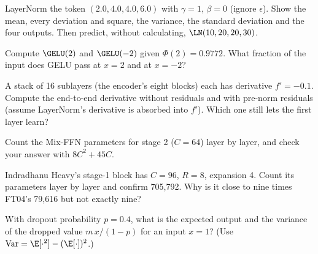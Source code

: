 \begin{checkyourself}
\item\label{ex:block:1} LayerNorm the token $(2.0, 4.0, 4.0, 6.0)$ with $\gamma = 1$, $\beta = 0$
(ignore $\epsilon$). Show the mean, every deviation and square, the variance, the standard deviation
and the four outputs. Then predict, without calculating, $\LN(10, 20, 20, 30)$.
\item\label{ex:block:2} Compute $\GELU(2)$ and $\GELU(-2)$ given $\Phi(2) = 0.9772$. What fraction
of the input does GELU pass at $x = 2$ and at $x = -2$?
\item\label{ex:block:3} A stack of 16 sublayers (the encoder's eight blocks) each has derivative
$f' = -0.1$. Compute the end-to-end derivative without residuals and with pre-norm residuals
(assume LayerNorm's derivative is absorbed into $f'$). Which one still lets the first layer learn?
\item\label{ex:block:4} Count the Mix-FFN parameters for stage 2 ($C = 64$) layer by layer, and
check your answer with $8C^2 + 45C$.
\item\label{ex:block:5} Indradhanu Heavy's stage-1 block has $C = 96$, $R = 8$, expansion 4. Count
its parameters layer by layer and confirm 705{,}792. Why is it close to nine times FT04's 79{,}616
but not exactly nine?
\item\label{ex:block:6} With dropout probability $p = 0.4$, what is the expected output and the
variance of the dropped value $m\,x/(1-p)$ for an input $x = 1$? (Use
$\operatorname{Var} = \E[\cdot^2] - (\E[\cdot])^2$.)
\end{checkyourself}

